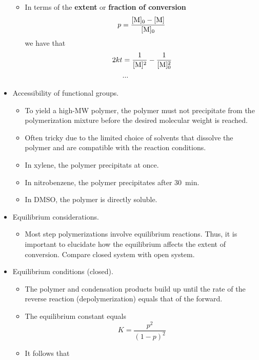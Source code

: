 \documentclass[../notes.tex]{subfiles}
\begin{document}
\begin{itemize}
\begin{itemize}
        \item In terms of the \textbf{extent} or \textbf{fraction of conversion}
        \begin{equation*}
            p = \frac{[\ce{M}]_0-[\ce{M}]}{[\ce{M}]_0}
        \end{equation*}
        we have that
        \begin{align*}
            2kt &= \frac{1}{[\ce{M}]^2}-\frac{1}{[\ce{M}]_0^2}\\
            & ...
        \end{align*}
    \end{itemize}
    \item Accessibility of functional groups.
    \begin{itemize}
        \item To yield a high-MW polymer, the polymer must not precipitate from the polymerization mixture before the desired molecular weight is reached.
        \item Often tricky due to the limited choice of solvents that dissolve the polymer and are compatible with the reaction conditions.
        \item In xylene, the polymer precipitats at once.
        \item In nitrobenzene, the polymer precipitates after \SI{30}{\minute}.
        \item In DMSO, the polymer is directly soluble.
    \end{itemize}
    \item Equilibrium considerations.
    \begin{itemize}
        \item Most step polymerizations involve equilibrium reactions. Thus, it is important to elucidate how the equilibrium affects the extent of conversion. Compare closed system with open system.
    \end{itemize}
    \item Equilibrium conditions (closed).
    \begin{itemize}
        \item The polymer and condensation products build up until the rate of the reverse reaction (depolymerization) equals that of the forward.
        \item The equilibrium constant equals
        \begin{equation*}
            K = \frac{p^2}{(1-p)^2}
        \end{equation*}
        \item It follows that

\end{itemize}
\end{itemize}
\end{document}
